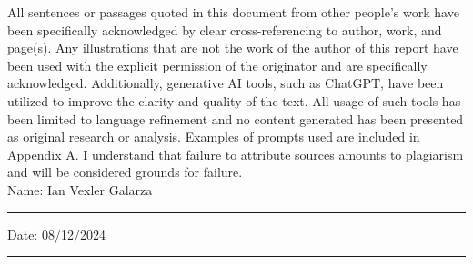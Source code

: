 \documentclass[11pt,oneside]{book}
\begin{document}
All sentences or passages quoted in this document from other people's work have been specifically acknowledged by clear cross-referencing to author, work, and page(s). Any illustrations that are not the work of the author of this report have been used with the explicit permission of the originator and are specifically acknowledged. Additionally, generative AI tools, such as ChatGPT, have been utilized to improve the clarity and quality of the text. All usage of such tools has been limited to language refinement and no content generated has been presented as original research or analysis. Examples of prompts used are included in Appendix A. I understand that failure to attribute sources amounts to plagiarism and will be considered grounds for failure.\\[1cm]

\noindent Name: Ian Vexler Galarza\\[1mm]
\rule[1em]{25em}{0.5pt}


\noindent Date: 08/12/2024\\[1mm]
\rule[1em]{25em}{0.5pt}







\clearpage
\tableofcontents


\clearpage
\listoftables



\mainmatter





% 
% 
% 



 
 


\begin{appendices}

% 
\end{appendices}
\end{document}
